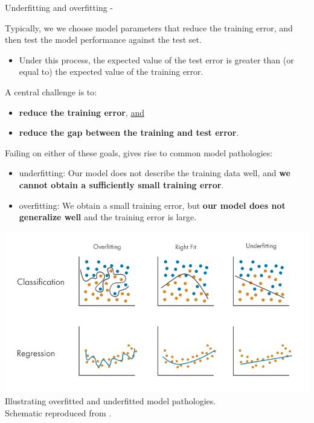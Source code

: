 

\begin{frame}[t,allowframebreaks]{Underfitting and overfitting -}

    Typically, 
    we we choose model parameters that reduce the training error, 
    and then test the model performance against the test set.
    \begin{itemize}
    \item 
    Under this process, 
    the expected value of the test error 
    is greater than (or equal to)  
    the expected value of the training error.
    \end{itemize}
 
    \vspace{0.2cm}
    
    A central challenge is to:
    \begin{itemize}
     \item {\bf reduce the training error}, \underline{and}
     \item {\bf reduce the gap between the training and test error}.
    \end{itemize}
 
    \vspace{0.2cm}   
 
    Failing on either of these goals, gives rise to common model pathologies:
    \begin{itemize}
      \item {}\Gls{underfitting}:
      Our model does not describe the training data well,
      and {\bf we cannot obtain a sufficiently small training error}.
      \item {}\Gls{overfitting}:
      We obtain a small training error,
      but {\bf our model does not generalize well} and  
      the training error is large. 
    \end{itemize}
 
    \framebreak
 
 
    \begin{center}
         \includegraphics[width=1.0\textwidth]
             {./images/training_issues/over_and_underfitting_1.png}\\
         {\tiny 
             Illustrating overfitted and underfitted model pathologies.\\
             \color{col:attribution} 
             Schematic reproduced from \cite{MathWorks:Overfitting}.\\
         }
     \end{center}


\end{frame}
